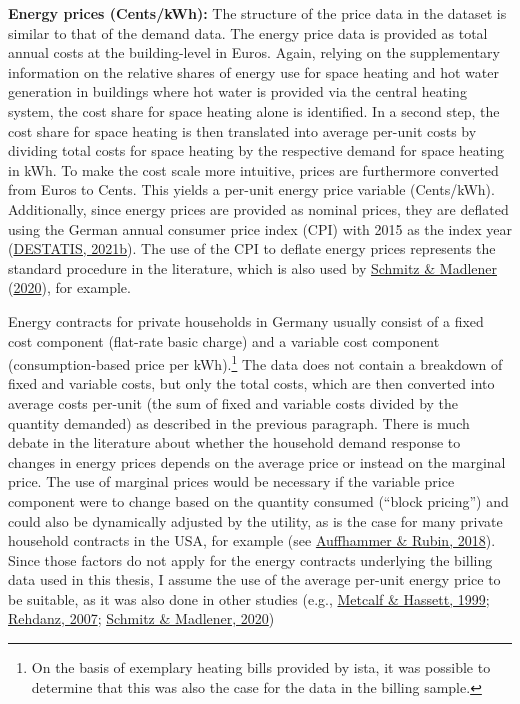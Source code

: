 \documentclass[12pt,twoside]{reedthesis}
\begin{document}
\textbf{Energy prices (Cents/kWh):} The structure of the price data in the dataset is similar to that of the demand data. The energy price data is provided as total annual costs at the building-level in Euros. Again, relying on the supplementary information on the relative shares of energy use for space heating and hot water generation in buildings where hot water is provided via the central heating system, the cost share for space heating alone is identified. In a second step, the cost share for space heating is then translated into average per-unit costs by dividing total costs for space heating by the respective demand for space heating in kWh. To make the cost scale more intuitive, prices are furthermore converted from Euros to Cents. This yields a per-unit energy price variable (Cents/kWh). Additionally, since energy prices are provided as nominal prices, they are deflated using the German annual consumer price index (CPI) with 2015 as the index year (\protect\hyperlink{ref-destatis21}{DESTATIS, 2021b}). The use of the CPI to deflate energy prices represents the standard procedure in the literature, which is also used by \protect\hyperlink{ref-schmitz_madlener20}{Schmitz \& Madlener} (\protect\hyperlink{ref-schmitz_madlener20}{2020}), for example.

Energy contracts for private households in Germany usually consist of a fixed cost component (flat-rate basic charge) and a variable cost component (consumption-based price per kWh).\footnote{On the basis of exemplary heating bills provided by ista, it was possible to determine that this was also the case for the data in the billing sample.} The data does not contain a breakdown of fixed and variable costs, but only the total costs, which are then converted into average costs per-unit (the sum of fixed and variable costs divided by the quantity demanded) as described in the previous paragraph. There is much debate in the literature about whether the household demand response to changes in energy prices depends on the average price or instead on the marginal price. The use of marginal prices would be necessary if the variable price component were to change based on the quantity consumed (``block pricing'') and could also be dynamically adjusted by the utility, as is the case for many private household contracts in the USA, for example (see \protect\hyperlink{ref-auffhammer_rubin18}{Auffhammer \& Rubin, 2018}). Since those factors do not apply for the energy contracts underlying the billing data used in this thesis, I assume the use of the average per-unit energy price to be suitable, as it was also done in other studies (e.g., \protect\hyperlink{ref-metcalf_hassett99}{Metcalf \& Hassett, 1999}; \protect\hyperlink{ref-rehdanz07}{Rehdanz, 2007}; \protect\hyperlink{ref-schmitz_madlener20}{Schmitz \& Madlener, 2020})
\end{document}
